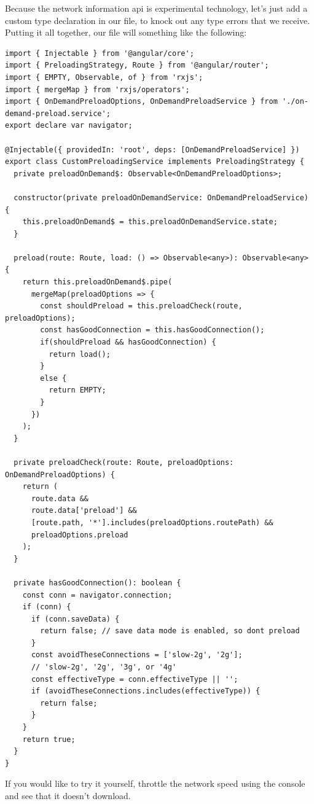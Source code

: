 Because the network information api is experimental technology, let's just add a custom 
type declaration in our file, to knock out any type errors that we receive. Putting it 
all together, our file will something like the following: 
\begin{lstlisting}[caption=custom-preloading.service.ts]
import { Injectable } from '@angular/core';
import { PreloadingStrategy, Route } from '@angular/router';
import { EMPTY, Observable, of } from 'rxjs';
import { mergeMap } from 'rxjs/operators';
import { OnDemandPreloadOptions, OnDemandPreloadService } from './on-demand-preload.service';
export declare var navigator;

@Injectable({ providedIn: 'root', deps: [OnDemandPreloadService] })
export class CustomPreloadingService implements PreloadingStrategy {
  private preloadOnDemand$: Observable<OnDemandPreloadOptions>;

  constructor(private preloadOnDemandService: OnDemandPreloadService) {
    this.preloadOnDemand$ = this.preloadOnDemandService.state;
  }

  preload(route: Route, load: () => Observable<any>): Observable<any> {
    return this.preloadOnDemand$.pipe(
      mergeMap(preloadOptions => {
        const shouldPreload = this.preloadCheck(route, preloadOptions);
        const hasGoodConnection = this.hasGoodConnection();
        if(shouldPreload && hasGoodConnection) {
          return load();
        }
        else {
          return EMPTY;
        }
      })
    );
  }

  private preloadCheck(route: Route, preloadOptions: OnDemandPreloadOptions) {
    return (
      route.data &&
      route.data['preload'] &&
      [route.path, '*'].includes(preloadOptions.routePath) &&
      preloadOptions.preload
    );
  }

  private hasGoodConnection(): boolean {
    const conn = navigator.connection;
    if (conn) {
      if (conn.saveData) {
        return false; // save data mode is enabled, so dont preload
      }
      const avoidTheseConnections = ['slow-2g', '2g'];
      // 'slow-2g', '2g', '3g', or '4g'
      const effectiveType = conn.effectiveType || '';
      if (avoidTheseConnections.includes(effectiveType)) {
        return false;
      }
    }
    return true;
  }
}
\end{lstlisting}

If you would like to try it yourself, throttle the network speed using the console 
and see that it doesn't download. 